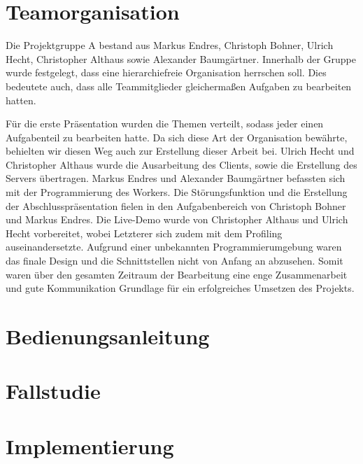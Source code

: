 \documentclass[10pt,a4paper]{article}
\begin{document}
\section{Teamorganisation}	%
Die Projektgruppe A bestand aus Markus Endres, Christoph Bohner, Ulrich Hecht, Christopher Althaus sowie Alexander Baumgärtner. Innerhalb der Gruppe wurde festgelegt, dass eine hierarchiefreie Organisation herrschen soll. Dies bedeutete auch, dass alle Teammitglieder gleichermaßen Aufgaben zu bearbeiten hatten. 

Für die erste Präsentation wurden die Themen verteilt, sodass jeder einen Aufgabenteil zu bearbeiten hatte. Da sich diese Art der Organisation bewährte, behielten wir diesen Weg auch zur Erstellung dieser Arbeit bei. Ulrich Hecht und Christopher Althaus wurde die Ausarbeitung des Clients, sowie die Erstellung des Servers übertragen. Markus Endres und Alexander Baumgärtner befassten sich mit der Programmierung des Workers. Die Störungsfunktion und die Erstellung der Abschlusspräsentation fielen in den Aufgabenbereich von Christoph Bohner und Markus Endres. Die Live-Demo wurde von Christopher Althaus und Ulrich Hecht vorbereitet, wobei Letzterer sich zudem mit dem Profiling auseinandersetzte.  Aufgrund einer unbekannten Programmierumgebung waren das finale Design und die Schnittstellen nicht von Anfang an abzusehen. Somit waren über den gesamten Zeitraum der Bearbeitung eine enge Zusammenarbeit und gute Kommunikation Grundlage für ein erfolgreiches Umsetzen des Projekts.
\newpage

\section{Bedienungsanleitung}

\section{Fallstudie}

\section{Implementierung}


\end{document}
